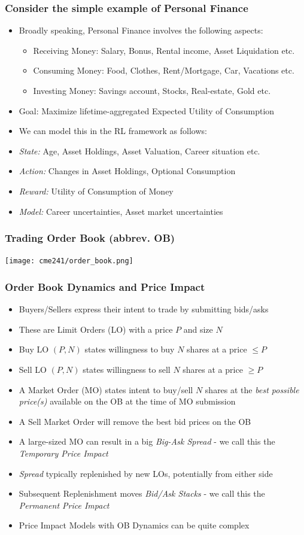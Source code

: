\documentclass{beamer}
\begin{document}
\begin{frame}
\frametitle{Consider the simple example of Personal Finance}
\pause
\begin{itemize}[<+->]
\item Broadly speaking, Personal Finance involves the following aspects:
\pause
\begin{itemize}[<+->]
\item Receiving Money: Salary, Bonus, Rental income, Asset Liquidation etc.
\item Consuming Money: Food, Clothes, Rent/Mortgage, Car, Vacations etc.
\item Investing Money: Savings account, Stocks, Real-estate, Gold etc.
\end{itemize}
\item Goal: Maximize lifetime-aggregated Expected Utility of Consumption
\item We can model this in the RL framework as follows:
\item {\em State:} Age, Asset Holdings, Asset Valuation, Career situation etc.
\item {\em Action:} Changes in Asset Holdings, Optional Consumption
\item {\em Reward:} Utility of Consumption of Money
\item {\em Model:} Career uncertainties, Asset market uncertainties
\end{itemize}
\end{frame}


\begin{frame}
\frametitle{Trading Order Book (abbrev. OB)}
\texttt{[image: cme241/order\_book.png]}
\end{frame}

\begin{frame}
\frametitle{Order Book Dynamics and Price Impact}
\pause
\begin{itemize}[<+->]
\item Buyers/Sellers express their intent to trade by submitting bids/asks
\item These are Limit Orders (LO) with a price $P$ and size $N$
\item Buy LO $(P, N)$ states willingness to buy $N$ shares at a price $\leq P$
\item Sell  LO $(P, N)$ states willingness to sell $N$ shares at a price $\geq P$
\item A Market Order (MO) states intent to buy/sell $N$ shares at the {\em best possible price(s)} available on the OB at the time of MO submission
\item A Sell Market Order will remove the best bid prices on the OB
\item A large-sized MO can result in a big {\em Big-Ask Spread} - we call this the {\em Temporary Price Impact}
\item {\em Spread} typically replenished by new LOs, potentially from either side
\item Subsequent Replenishment moves {\em Bid/Ask Stacks} - we call this the {\em Permanent Price Impact}
\item Price Impact Models with OB Dynamics can be quite complex
\end{itemize}
\end{frame}
\end{document}
